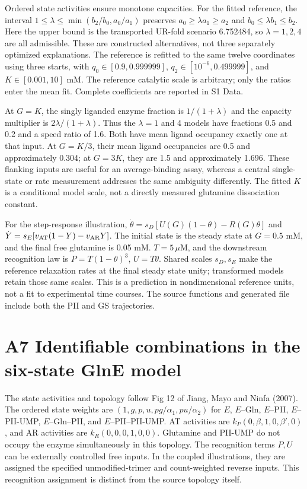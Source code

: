 \documentclass[11pt]{article}
\begin{document}
Ordered state activities ensure monotone capacities. For the fitted reference, the interval $1\le\lambda\le\min(b_2/b_0,a_0/a_1)$ preserves $a_0\ge\lambda a_1\ge a_2$ and $b_0\le\lambda b_1\le b_2$. Here the upper bound is the transported UR-fold scenario 6.752484, so $\lambda=1,2,4$ are all admissible. These are constructed alternatives, not three separately optimized explanations. The reference is refitted to the same twelve coordinates using three starts, with $q_0\in[0.9,0.999999]$, $q_2\in[10^{-6},0.499999]$, and $K\in[0.001,10]$ mM. The reference catalytic scale is arbitrary; only the ratios enter the mean fit. Complete coefficients are reported in S1 Data.

At $G=K$, the singly liganded enzyme fraction is $1/(1+\lambda)$ and the capacity multiplier is $2\lambda/(1+\lambda)$. Thus the $\lambda=1$ and 4 models have fractions 0.5 and 0.2 and a speed ratio of 1.6. Both have mean ligand occupancy exactly one at that input. At $G=K/3$, their mean ligand occupancies are 0.5 and approximately 0.304; at $G=3K$, they are 1.5 and approximately 1.696. These flanking inputs are useful for an average-binding assay, whereas a central single-state or rate measurement addresses the same ambiguity differently. The fitted $K$ is a conditional model scale, not a directly measured glutamine dissociation constant.

For the step-response illustration, $\dot\theta=s_D[U(G)(1-\theta)-R(G)\theta]$ and $\dot Y=s_E[v_{\rm AT}(1-Y)-v_{\rm AR}Y]$. The initial state is the steady state at $G=0.5$ mM, and the final free glutamine is 0.05 mM. $T=5\,\mu$M, and the downstream recognition law is $P=T(1-\theta)^3$, $U=T\theta$. Shared scales $s_D,s_E$ make the reference relaxation rates at the final steady state unity; transformed models retain those same scales. This is a prediction in nondimensional reference units, not a fit to experimental time courses. The source functions and generated file include both the PII and GS trajectories.

\section*{A7 Identifiable combinations in the six-state GlnE model}

The state activities and topology follow Fig 12 of Jiang, Mayo and Ninfa (2007). The ordered state weights are $(1,g,p,u,pg/\alpha_1,pu/\alpha_2)$ for $E$, $E$--Gln, $E$--PII, $E$--PII-UMP, $E$--Gln--PII, and $E$--PII--PII-UMP. AT activities are $k_P(0,\beta,1,0,\beta',0)$, and AR activities are $k_R(0,0,0,1,0,0)$. Glutamine and PII-UMP do not occupy the enzyme simultaneously in this topology. The recognition terms $P,U$ can be externally controlled free inputs. In the coupled illustrations, they are assigned the specified unmodified-trimer and count-weighted reverse inputs. This recognition assignment is distinct from the source topology itself.
\end{document}
